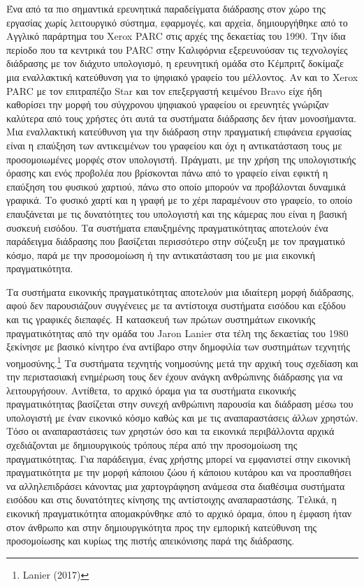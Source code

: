 \documentclass[
]{article}
\begin{document}
Ένα από τα πιο σημαντικά ερευνητικά παραδείγματα διάδρασης στον χώρο της
εργασίας χωρίς λειτουργικό σύστημα, εφαρμογές, και αρχεία, δημιουργήθηκε
από το Αγγλικό παράρτημα του Xerox PARC στις αρχές της δεκαετίας του
1990. Την ίδια περίοδο που τα κεντρικά του PARC στην Καλιφόρνια
εξερευνούσαν τις τεχνολογίες διάδρασης με τον διάχυτο υπολογισμό, η
ερευνητική ομάδα στο Κέμπριτζ δοκίμαζε μια εναλλακτική κατεύθυνση για το
ψηφιακό γραφείο του μέλλοντος. Αν και το Xerox PARC με τον επιτραπέζιο
Star και τον επεξεργαστή κειμένου Bravo είχε ήδη καθορίσει την μορφή του
σύγχρονου ψηφιακού γραφείου οι ερευνητές γνώριζαν καλύτερα από τους
χρήστες ότι αυτά τα συστήματα διάδρασης δεν ήταν μονοσήμαντα. Μια
εναλλακτική κατεύθυνση για την διάδραση στην πραγματική επιφάνεια
εργασίας είναι η επαύξηση των αντικειμένων του γραφείου και όχι η
αντικατάσταση τους με προσομοιωμένες μορφές στον υπολογιστή. Πράγματι,
με την χρήση της υπολογιστικής όρασης και ενός προβολέα που βρίσκονται
πάνω από το γραφείο είναι εφικτή η επαύξηση του φυσικού χαρτιού, πάνω
στο οποίο μπορούν να προβάλονται δυναμικά γραφικά. Το φυσικό χαρτί και η
γραφή με το χέρι παραμένουν στο γραφείο, το οποίο επαυξάνεται με τις
δυνατότητες του υπολογιστή και της κάμερας που είναι η βασική συσκευή
εισόδου. Τα συστήματα επαυξημένης πραγματικότητας αποτελούν ένα
παράδειγμα διάδρασης που βασίζεται περισσότερο στην σύζευξη με τον
πραγματικό κόσμο, παρά με την προσομοίωση ή την αντικατάσταση του με μια
εικονική πραγματικότητα.

Τα συστήματα εικονικής πραγματικότητας αποτελούν μια ιδιαίτερη μορφή
διάδρασης, αφού δεν παρουσιάζουν συγγένειες με τα αντίστοιχα συστήματα
εισόδου και εξόδου και τις γραφικές διεπαφές. Η κατασκευή των πρώτων
συστημάτων εικονικής πραγματικότητας από την ομάδα του Jaron Lanier στα
τέλη της δεκαετίας του 1980 ξεκίνησε με βασικό κίνητρο ένα αντίβαρο στην
δημοφιλία των συστημάτων τεχνητής νοημοσύνης.\footnote{Lanier (2017)} Τα
συστήματα τεχνητής νοημοσύνης μετά την αρχική τους σχεδίαση και την
περιστασιακή ενημέρωση τους δεν έχουν ανάγκη ανθρώπινης διάδρασης για να
λειτουργήσουν. Αντίθετα, το αρχικό όραμα για τα συστήματα εικονικής
πραγματικότητας βασίζεται στην συνεχή ανθρώπινη παρουσία και διάδραση
μέσω του υπολογιστή με έναν εικονικό κόσμο καθώς και με τις
αναπαραστάσεις άλλων χρηστών. Τόσο οι αναπαραστάσεις των χρηστών όσο και
τα εικονικά περιβάλλοντα αρχικά σχεδιάζονται με δημιουργικούς τρόπους
πέρα από την προσομοίωση της πραγματικότητας. Για παράδειγμα, ένας
χρήστης μπορεί να εμφανιστεί στην εικονική πραγματικότητα με την μορφή
κάποιου ζώου ή κάποιου κυτάρου και να προσπαθήσει να αλληλεπιδράσει
κάνοντας μια χαρτογράφηση ανάμεσα στα διαθέσιμα συστήματα εισόδου και
στις δυνατότητες κίνησης της αντίστοιχης αναπαραστάσης. Τελικά, η
εικονική πραγματικότητα απομακρύνθηκε από το αρχικό όραμα, όπου η έμφαση
ήταν στον άνθρωπο και στην δημιουργικότητα προς την εμπορική κατεύθυνση
της προσομοίωσης και κυρίως της πιστής απεικόνισης παρά της διάδρασης.
\end{document}
